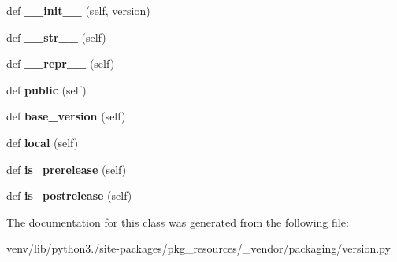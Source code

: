 \begin{DoxyCompactItemize}
\item 
\mbox{\label{classpkg__resources_1_1__vendor_1_1packaging_1_1version_1_1_legacy_version_ae5d3f571bca144067e99fc12c89f1814}} 
def {\bfseries \+\_\+\+\_\+init\+\_\+\+\_\+} (self, version)
\item 
\mbox{\label{classpkg__resources_1_1__vendor_1_1packaging_1_1version_1_1_legacy_version_a12e3140dca0d1608e94532a8c4290bc3}} 
def {\bfseries \+\_\+\+\_\+str\+\_\+\+\_\+} (self)
\item 
\mbox{\label{classpkg__resources_1_1__vendor_1_1packaging_1_1version_1_1_legacy_version_a0882c578a893a399d01ee90b3f218b5c}} 
def {\bfseries \+\_\+\+\_\+repr\+\_\+\+\_\+} (self)
\item 
\mbox{\label{classpkg__resources_1_1__vendor_1_1packaging_1_1version_1_1_legacy_version_a3bc07656d9072933898f618d685113cf}} 
def {\bfseries public} (self)
\item 
\mbox{\label{classpkg__resources_1_1__vendor_1_1packaging_1_1version_1_1_legacy_version_ada7b51696361b3339007d717a7eded4d}} 
def {\bfseries base\+\_\+version} (self)
\item 
\mbox{\label{classpkg__resources_1_1__vendor_1_1packaging_1_1version_1_1_legacy_version_a9ffd76cde683437bb134266d2480e23d}} 
def {\bfseries local} (self)
\item 
\mbox{\label{classpkg__resources_1_1__vendor_1_1packaging_1_1version_1_1_legacy_version_af1c08627fa6f1cbfc1d09f2ccb48746a}} 
def {\bfseries is\+\_\+prerelease} (self)
\item 
\mbox{\label{classpkg__resources_1_1__vendor_1_1packaging_1_1version_1_1_legacy_version_afb598a951757802d499b33a0d09fea29}} 
def {\bfseries is\+\_\+postrelease} (self)
\end{DoxyCompactItemize}


The documentation for this class was generated from the following file\+:\begin{DoxyCompactItemize}
\item 
venv/lib/python3./site-\/packages/pkg\+\_\+resources/\+\_\+vendor/packaging/version.\+py\end{DoxyCompactItemize}
